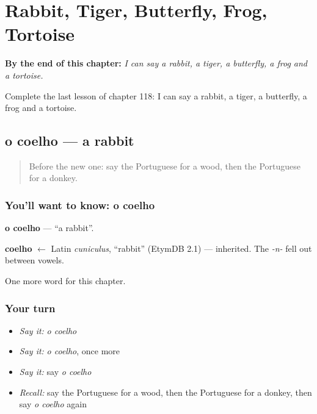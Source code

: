 
\chapter{Rabbit, Tiger, Butterfly, Frog, Tortoise}
\label{ch:pt-rabbit-tiger-butterfly-frog-tortoise}

\begin{chapteropening}
\textbf{By the end of this chapter:} \emph{I can say a rabbit, a tiger, a butterfly, a frog and a tortoise.}

Complete the last lesson of chapter 118: I can say a rabbit, a tiger, a butterfly, a frog and a tortoise.
\end{chapteropening}

\section[o coelho]{o coelho — a rabbit}

\label{lesson:PT-C118-coelho}



\begin{quote}
Before the new one: say the Portuguese for a wood, then the Portuguese for a donkey.
\end{quote}

\subsection*{You'll want to know: o coelho}
\textbf{o coelho} — \textquotedblleft{}a rabbit\textquotedblright{}.

\begin{cousinweb}
\textbf{coelho} $\leftarrow$ Latin \emph{cuniculus}, \textquotedblleft{}rabbit\textquotedblright{} (EtymDB 2.1) — inherited. The \emph{-n-} fell out between vowels.
\end{cousinweb}

\begin{grammarlens}[title={What you've built}]
One more word for this chapter.
\end{grammarlens}

\subsection*{Your turn}
\begin{itemize}
\raggedright
  \item \emph{Say it:} \emph{o coelho}
  \item \emph{Say it:} \emph{o coelho}, once more
  \item \emph{Say it:} say \emph{o coelho}
  \item \emph{Recall:} say the Portuguese for a wood, then the Portuguese for a donkey, then say \emph{o coelho} again
\end{itemize}

